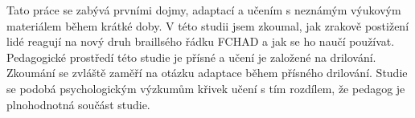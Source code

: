 Tato práce se zabývá prvními dojmy, adaptací a učením s neznámým výukovým materiálem během krátké doby.
V této studii jsem zkoumal, jak zrakově postižení lidé reagují na nový druh braillsého řádku FCHAD a jak se ho naučí používat. Pedagogické prostředí této studie je přísné a učení je založené na drilování. Zkoumání se zvláště zaměří na otázku adaptace během přísného drilování.  Studie se podobá psychologickým výzkumům křivek učení s tím rozdílem, že pedagog je plnohodnotná součást studie.
